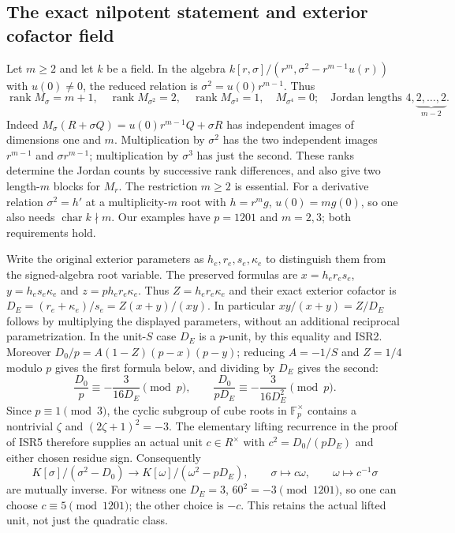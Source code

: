\documentclass[11pt]{article}
\begin{document}
\subsection{The exact nilpotent statement and exterior cofactor field}
Let $m\ge2$ and let $k$ be a field. In the algebra
$k[r,\sigma]/(r^m,\sigma^2-r^{m-1}u(r))$ with $u(0)\ne0$,
the reduced relation is $\sigma^2=u(0)r^{m-1}$. Thus
\begin{equation}
 \operatorname{rank}M_\sigma=m+1,\quad
 \operatorname{rank}M_{\sigma^2}=2,\quad
 \operatorname{rank}M_{\sigma^3}=1,\quad M_{\sigma^4}=0;
 \quad\text{Jordan lengths }4,\underbrace{2,\ldots,2}_{m-2}.
                                                               \tag{ISR29}
\end{equation}
Indeed $M_\sigma(R+\sigma Q)=u(0)r^{m-1}Q+\sigma R$ has
independent images of dimensions one and $m$. Multiplication by
$\sigma^2$ has the two independent images $r^{m-1}$ and
$\sigma r^{m-1}$; multiplication by $\sigma^3$ has just the second.
These ranks determine the Jordan counts by successive rank
differences, and also give two length-$m$ blocks for $M_r$.
The restriction $m\ge2$ is essential. For a derivative relation
$\sigma^2=h'$ at a multiplicity-$m$ root with $h=r^m g$,
$u(0)=mg(0)$, so one also needs $\operatorname{char}k\nmid m$.
Our examples have $p=1201$ and $m=2,3$; both requirements hold.

Write the original exterior parameters as $h_e,r_e,s_e,\kappa_e$
to distinguish them from the signed-algebra root variable. The
preserved formulas are $x=h_er_es_e$, $y=h_es_e\kappa_e$ and
$z=ph_er_e\kappa_e$. Thus $Z=h_er_e\kappa_e$ and their exact
exterior cofactor is
$D_E=(r_e+\kappa_e)/s_e=Z(x+y)/(xy)$. In particular
$xy/(x+y)=Z/D_E$ follows by multiplying the displayed parameters,
without an additional reciprocal parametrization. In the unit-$S$
case $D_E$ is a $p$-unit, by this equality and ISR2. Moreover
$D_0/p=A(1-Z)(p-x)(p-y)$; reducing $A=-1/S$ and $Z=1/4$
modulo $p$ gives the first formula below, and dividing by $D_E$
gives the second:
\begin{equation}
 \frac{D_0}{p}\equiv-\frac3{16D_E}\pmod p,
 \qquad \frac{D_0}{pD_E}\equiv-\frac3{16D_E^2}\pmod p.
                                                               \tag{ISR30}
\end{equation}
Since $p\equiv1\pmod3$, the cyclic subgroup of cube roots in
$\mathbb F_p^\times$ contains a nontrivial $\zeta$ and
$(2\zeta+1)^2=-3$. The elementary lifting recurrence in the proof
of ISR5 therefore supplies an actual unit $c\in R^\times$ with
$c^2=D_0/(pD_E)$ and either chosen residue sign. Consequently
\begin{equation}
 K[\sigma]/(\sigma^2-D_0)\longrightarrow
 K[\omega]/(\omega^2-pD_E),\qquad
 \sigma\longmapsto c\omega,\qquad \omega\longmapsto c^{-1}\sigma
                                                               \tag{ISR31}
\end{equation}
are mutually inverse. For witness one $D_E=3$, $60^2=-3\pmod{1201}$,
so one can choose $c\equiv5\pmod{1201}$; the other choice is $-c$.
This retains the actual lifted unit, not just the quadratic class.
\end{document}
